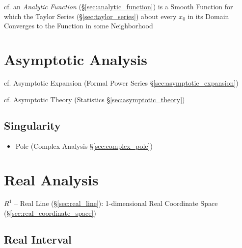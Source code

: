 \fist cf. an \emph{Analytic Function} (\S\ref{sec:analytic_function}) is a
Smooth Function for which the Taylor Series (\S\ref{sec:taylor_series}) about
every $x_0$ in its Domain Converges to the Function in some Neighborhood



\section{Asymptotic Analysis}\label{sec:asymptotic_analysis}


\fist cf. Asymptotic Expansion (Formal Power Series
\S\ref{sec:asymptotic_expansion})

\fist cf. Asymptotic Theory (Statistics \S\ref{sec:asymptotic_theory})



\subsection{Singularity}\label{sec:singularity}

\begin{itemize}
  \item Pole (Complex Analysis \S\ref{sec:complex_pole})
\end{itemize}



\section{Real Analysis}\label{sec:real_analysis}

$R^1$ -- Real Line (\S\ref{sec:real_line}): 1-dimensional Real
Coordinate Space (\S\ref{sec:real_coordinate_space})



\subsection{Real Interval}\label{sec:real_interval}


